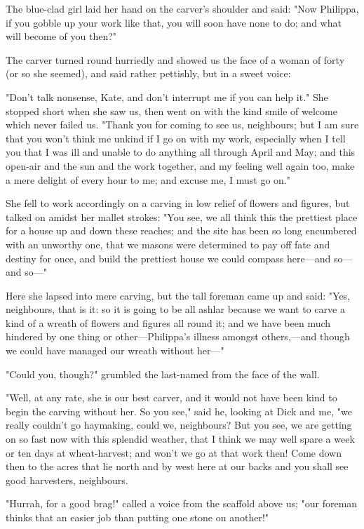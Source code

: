The blue-clad girl laid her hand on the carver's shoulder and said: "Now
Philippa, if you gobble up your work like that, you will soon have none
to do; and what will become of you then?"

The carver turned round hurriedly and showed us the face of a woman of
forty (or so she seemed), and said rather pettishly, but in a sweet
voice:

"Don't talk nonsense, Kate, and don't interrupt me if you can help it."
She stopped short when she saw us, then went on with the kind smile of
welcome which never failed us. "Thank you for coming to see us,
neighbours; but I am sure that you won't think me unkind if I go on with
my work, especially when I tell you that I was ill and unable to do
anything all through April and May; and this open-air and the sun and
the work together, and my feeling well again too, make a mere delight of
every hour to me; and excuse me, I must go on."

She fell to work accordingly on a carving in low relief of flowers and
figures, but talked on amidst her mallet strokes: "You see, we all think
this the prettiest place for a house up and down these reaches; and the
site has been so long encumbered with an unworthy one, that we masons
were determined to pay off fate and destiny for once, and build the
prettiest house we could compass here---and so---and so---"

Here she lapsed into mere carving, but the tall foreman came up and
said: "Yes, neighbours, that is it: so it is going to be all ashlar
because we want to carve a kind of a wreath of flowers and figures all
round it; and we have been much hindered by one thing or
other---Philippa's illness amongst others,---and though we could have
managed our wreath without her---"

"Could you, though?" grumbled the last-named from the face of the wall.

"Well, at any rate, she is our best carver, and it would not have been
kind to begin the carving without her. So you see," said he, looking at
Dick and me, "we really couldn't go haymaking, could we, neighbours? But
you see, we are getting on so fast now with this splendid weather, that
I think we may well spare a week or ten days at wheat-harvest; and won't
we go at that work then! Come down then to the acres that lie north and
by west here at our backs and you shall see good harvesters, neighbours.

"Hurrah, for a good brag!" called a voice from the scaffold above us;
"our foreman thinks that an easier job than putting one stone on
another!"

